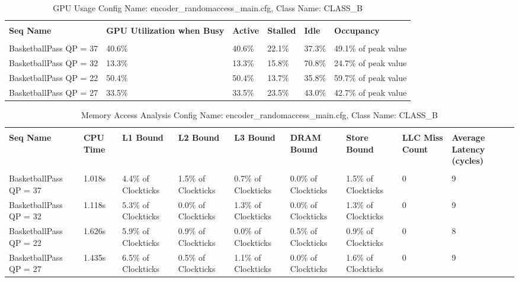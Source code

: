\documentclass{article}%
\begin{document}
\newpage%
\begin{longtabu}{| X[l] | X[l] | X[l] | X[l] | X[l] | X[l] |}%
\caption{%
GPU Usage\newline%
 Config Name: encoder\_randomaccess\_main.cfg,\newline%
 Class Name: CLASS\_B\newline%
%
}%
\hline%
&&&&&\\%
\textbf{Seq Name}&\textbf{GPU Utilization when Busy}&\textbf{Active}&\textbf{Stalled}&\textbf{Idle}&\textbf{Occupancy}\\%
&&&&&\\%
\hline%
\endhead%
BasketballPass\newline%
 QP = 37&40.6\%&40.6\%&22.1\%&37.3\%&49.1\% of peak value\\%
\hline%
BasketballPass\newline%
 QP = 32&13.3\%&13.3\%&15.8\%&70.8\%&24.7\% of peak value\\%
\hline%
BasketballPass\newline%
 QP = 22&50.4\%&50.4\%&13.7\%&35.8\%&59.7\% of peak value\\%
\hline%
BasketballPass\newline%
 QP = 27&33.5\%&33.5\%&23.5\%&43.0\%&42.7\% of peak value\\%
\hline%
\end{longtabu}%
\begin{longtabu}{| X[l] | X[l] | X[l] | X[l] | X[l] | X[l] | X[l] | X[l] | X[l] |}%
\caption{%
Memory Access Analysis\newline%
 Config Name: encoder\_randomaccess\_main.cfg,\newline%
 Class Name: CLASS\_B\newline%
%
}%
\hline%
&&&&&&&&\\%
\textbf{Seq Name}&\textbf{CPU Time}&\textbf{L1 Bound}&\textbf{L2 Bound}&\textbf{L3 Bound}&\textbf{DRAM Bound}&\textbf{Store Bound}&\textbf{LLC Miss Count}&\textbf{Average Latency (cycles)}\\%
&&&&&&&&\\%
\hline%
\endhead%
BasketballPass\newline%
 QP = 37&1.018s&4.4\% of Clockticks&1.5\% of Clockticks&0.7\% of Clockticks&0.0\% of Clockticks&1.5\% of Clockticks&0&9\\%
\hline%
BasketballPass\newline%
 QP = 32&1.118s&5.3\% of Clockticks&0.0\% of Clockticks&1.3\% of Clockticks&0.0\% of Clockticks&1.3\% of Clockticks&0&9\\%
\hline%
BasketballPass\newline%
 QP = 22&1.626s&5.9\% of Clockticks&0.9\% of Clockticks&0.0\% of Clockticks&0.5\% of Clockticks&0.9\% of Clockticks&0&8\\%
\hline%
BasketballPass\newline%
 QP = 27&1.435s&6.5\% of Clockticks&0.5\% of Clockticks&1.1\% of Clockticks&0.0\% of Clockticks&1.6\% of Clockticks&0&9\\%
\hline%
\end{longtabu}%
\end{document}
